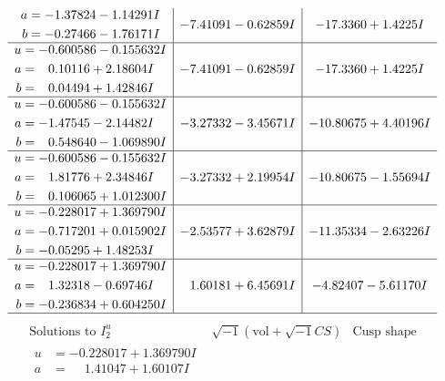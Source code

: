 \documentclass[1p]{elsarticle_modified}
\theoremstyle{definition}
\newcommand{\I}{\sqrt{-1}}
\begin{document}
$$\begin{array}{c|c|c}
\begin{aligned}
a &= -1.37824 - 1.14291 I \\
b &= -0.27466 - 1.76171 I\end{aligned}
 & -7.41091 - 0.62859 I & -17.3360 + 1.4225 I \\ \hline\begin{aligned}
u &= -0.600586 - 0.155632 I \\
a &= \phantom{-}0.10116 + 2.18604 I \\
b &= \phantom{-}0.04494 + 1.42846 I\end{aligned}
 & -7.41091 - 0.62859 I & -17.3360 + 1.4225 I \\ \hline\begin{aligned}
u &= -0.600586 - 0.155632 I \\
a &= -1.47545 - 2.14482 I \\
b &= \phantom{-}0.548640 - 1.069890 I\end{aligned}
 & -3.27332 - 3.45671 I & -10.80675 + 4.40196 I \\ \hline\begin{aligned}
u &= -0.600586 - 0.155632 I \\
a &= \phantom{-}1.81776 + 2.34846 I \\
b &= \phantom{-}0.106065 + 1.012300 I\end{aligned}
 & -3.27332 + 2.19954 I & -10.80675 - 1.55694 I \\ \hline\begin{aligned}
u &= -0.228017 + 1.369790 I \\
a &= -0.717201 + 0.015902 I \\
b &= -0.05295 + 1.48253 I\end{aligned}
 & -2.53577 + 3.62879 I & -11.35334 - 2.63226 I \\ \hline\begin{aligned}
u &= -0.228017 + 1.369790 I \\
a &= \phantom{-}1.32318 - 0.69746 I \\
b &= -0.236834 + 0.604250 I\end{aligned}
 & \phantom{-}1.60181 + 6.45691 I & -4.82407 - 5.61170 I\\
 \hline 
 \end{array}$$\newpage$$\begin{array}{c|c|c}  
\text{Solutions to }I^u_{2}& \I (\text{vol} + \sqrt{-1}CS) & \text{Cusp shape}\\
 \hline 
\begin{aligned}
u &= -0.228017 + 1.369790 I \\
a &= \phantom{-}1.41047 + 1.60107 I \\

\end{aligned}
\end{array}$$
\end{document}
